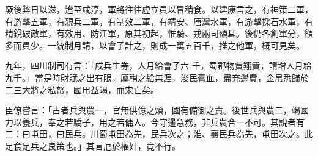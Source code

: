 \begin{pinyinscope}
 厥後弊日以滋，迨至咸淳，軍將往往虛立員以冒稍食。以建康言之，有神策二軍，有游擊五軍，有親兵二軍，有制效二軍，有靖安、唐灣水軍，有游擊採石水軍，有精銳破敵軍，有效用、防江軍，原其初起，惟騎、戎兩司額耳。後仍各創軍分，額多而員少。一統制月請，以會子計之，則成一萬五百千，推之他軍，概可見矣。



 九年，四川制司有言：「戍兵生券，人月給會子六
 千，蜀郡物賈翔貴，請增人月給九千。」當是時財賦之出有限，廩稍之給無涯，浚民膏血，盡充邊費，金帛悉歸於二三大將之私帑，國用益竭，而宋亡矣。



 臣僚嘗言：「古者兵與農一，官無供億之煩，國有備御之責。後世兵與農二，竭國力以養兵，奉之若驕子，用之若傭人。今守邊急務，非兵農合一不可。其說者有二：曰屯田，曰民兵。川蜀屯田為先，民兵次之；淮、襄民兵為先，屯田次之。此足食足兵之良策也。」其言厄於權奸，竟不行。



\end{pinyinscope}